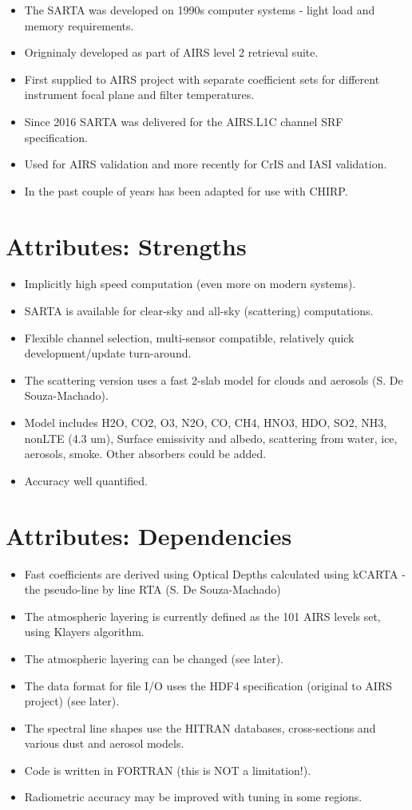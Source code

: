 \documentclass[10pt,t]{article}
\begin{document}
\begin{itemize}
\item The SARTA was developed on 1990s computer systems - light load and memory requirements.
\item Origninaly developed as part of AIRS level 2 retrieval suite.
\item First supplied to AIRS project with separate coefficient sets for different instrument focal
plane and filter temperatures.
\item Since 2016 SARTA was delivered for the AIRS.L1C channel SRF specification.
\item Used for AIRS validation and more recently for CrIS and IASI validation.
\item In the past couple of years has been adapted for use with CHIRP.
\end{itemize}


\section{Attributes: Strengths}
\label{sec:org018d11a}
\begin{itemize}
\item Implicitly high speed computation (even more on modern systems).
\item SARTA is available for clear-sky and all-sky (scattering) computations.
\item Flexible channel selection, multi-sensor compatible, relatively quick development/update turn-around.
\item The scattering version uses a fast 2-slab model for clouds and aerosols (S. De Souza-Machado).
\item Model includes H2O, CO2, O3, N2O, CO, CH4, HNO3, HDO, SO2, NH3, nonLTE (4.3 um), Surface emissivity
and albedo, scattering from water, ice, aerosols, smoke.  Other absorbers could be added.
\item Accuracy well quantified.
\end{itemize}

\section{Attributes: Dependencies}
\label{sec:org795b3c5}
\begin{itemize}
\item Fast coefficients are derived using Optical Depths calculated using kCARTA - the pseudo-line by line
RTA (S. De Souza-Machado)
\item The atmospheric layering is currently defined as the 101 AIRS levels set, using Klayers algorithm.
\item The atmospheric layering can be changed (see later).
\item The data format for file I/O uses the HDF4 specification (original to AIRS project) (see later).
\item The spectral line shapes use the HITRAN databases, cross-sections and various dust and aerosol models.
\item Code is written in FORTRAN (this is NOT a limitation!).
\item Radiometric accuracy may be improved with tuning in some regions.
\end{itemize}
\end{document}
